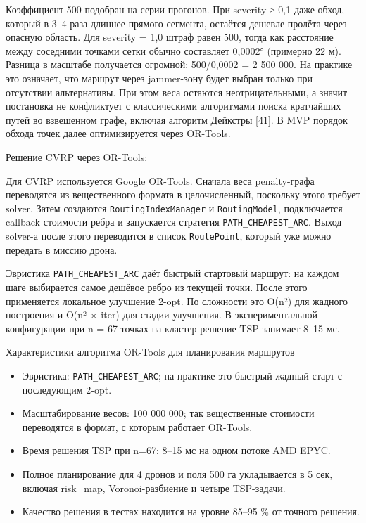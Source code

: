 \documentclass[14pt,a4paper]{extarticle}
\begin{document}
Коэффициент 500 подобран на серии прогонов. При severity ≥ 0,1 даже обход, который в 3--4 раза длиннее прямого сегмента, остаётся дешевле пролёта через опасную область. Для severity = 1,0 штраф равен 500, тогда как расстояние между соседними точками сетки обычно составляет 0,0002° (примерно 22 м). Разница в масштабе получается огромной: 500/0,0002 = 2 500 000. На практике это означает, что маршрут через jammer-зону будет выбран только при отсутствии альтернативы. При этом веса остаются неотрицательными, а значит постановка не конфликтует с классическими алгоритмами поиска кратчайших путей во взвешенном графе, включая алгоритм Дейкстры {[}41{]}. В MVP порядок обхода точек далее оптимизируется через OR-Tools.

Решение CVRP через OR-Tools:

Для CVRP используется Google OR-Tools. Сначала веса penalty-графа переводятся из вещественного формата в целочисленный, поскольку этого требует solver. Затем создаются \texttt{RoutingIndexManager} и \texttt{RoutingModel}, подключается callback стоимости ребра и запускается стратегия \texttt{PATH\_CHEAPEST\_ARC}. Выход solver-а после этого переводится в список \texttt{RoutePoint}, который уже можно передать в миссию дрона.


Эвристика \texttt{PATH\_CHEAPEST\_ARC} даёт быстрый стартовый маршрут: на каждом шаге выбирается самое дешёвое ребро из текущей точки. После этого применяется локальное улучшение 2-opt. По сложности это O(n²) для жадного построения и O(n² × iter) для стадии улучшения. В экспериментальной конфигурации при n = 67 точках на кластер решение TSP занимает 8--15 мс.

Характеристики алгоритма OR-Tools для планирования маршрутов
\begin{itemize}
\item Эвристика: \texttt{PATH\_CHEAPEST\_ARC}; на практике это быстрый жадный старт с последующим 2-opt.
\item Масштабирование весов: 100 000 000; так вещественные стоимости переводятся в формат, с которым работает OR-Tools.
\item Время решения TSP при n=67: 8--15 мс на одном потоке AMD EPYC.
\item Полное планирование для 4 дронов и поля 500 га укладывается в 5 сек, включая risk\_map, Voronoi-разбиение и четыре TSP-задачи.
\item Качество решения в тестах находится на уровне 85--95 \% от точного решения.
\end{itemize}
\end{document}
